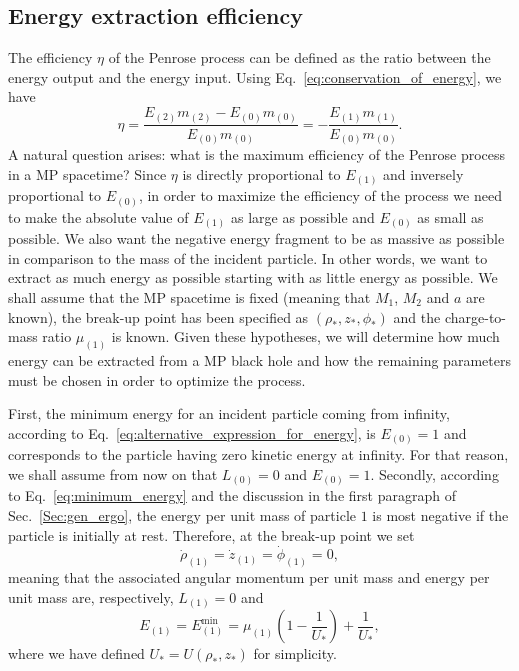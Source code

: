 \subsection{Energy extraction efficiency}

The efficiency $\eta$ of the Penrose process can be defined as the ratio between the energy output and the energy input. Using Eq.~\eqref{eq:conservation_of_energy}, we have
\begin{equation}
  \eta = \frac{E_{(2)}m_{(2)} - E_{(0)}m_{(0)}}{E_{(0)}m_{(0)}} = - \frac{E_{(1)}m_{(1)}}{E_{(0)}m_{(0)}}.
  \label{eq:penrose_efficiency_general}
\end{equation}
%
A natural question arises: what is the maximum efficiency of the Penrose process in a MP spacetime? Since $\eta$ is directly proportional to $E_{(1)}$ and inversely proportional to $E_{(0)}$, in order to maximize the efficiency of the process we need to make the absolute value of $E_{(1)}$ as large as possible and $E_{(0)}$ as small as possible. We also want the negative energy fragment to be as massive as possible in comparison to the mass of the incident particle. In other words, we want to extract as much energy as possible starting with as little energy as possible. We shall assume that the MP spacetime is fixed (meaning that $M_1$, $M_2$ and $a$ are known), the break-up point has been specified as $(\rho_*, z_*, \phi_*)$ and the charge-to-mass ratio $\mu_{(1)}$ is known. Given these hypotheses, we will determine how much energy can be extracted from a MP black hole and how the remaining parameters must be chosen in order to optimize the process.

First, the minimum energy for an incident particle coming from infinity, according to Eq.~\eqref{eq:alternative_expression_for_energy}, is $E_{(0)}=1$ and corresponds to the particle having zero kinetic energy at infinity. For that reason, we shall assume from now on that $L_{(0)}=0$ and $E_{(0)}=1$. Secondly, according to Eq.~\eqref{eq:minimum_energy} and the discussion in the first paragraph of Sec.~\ref{Sec:gen_ergo}, the energy per unit mass of particle $1$ is most negative if the particle is initially at rest. Therefore, at the break-up point we set
\begin{equation} \label{eq:traj1}
  \dot{\rho}_{(1)}=\dot{z}_{(1)}=\dot{\phi}_{(1)}=0,
\end{equation}
meaning that the associated angular momentum per unit mass and energy per unit mass are, respectively, $L_{(1)}=0$ and
\begin{equation} \label{eq:penrose_neg_energy}
  E_{(1)}=E_{(1)}^{\mathrm {min}}=\mu_{(1)}\left(1 - \frac{1}{U_*} \right) + \frac{1}{U_*},
\end{equation}
where we have defined $U_*=U(\rho_*,z_*)$ for simplicity.

